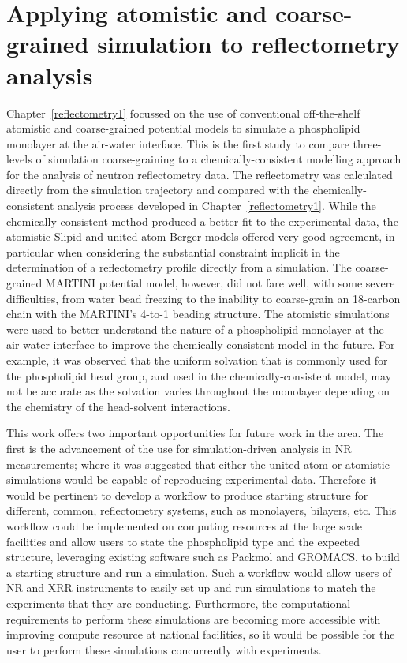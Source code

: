 \section{Applying atomistic and coarse-grained simulation to reflectometry analysis}
Chapter~\ref{reflectometry1} focussed on the use of conventional off-the-shelf atomistic and coarse-grained potential models to simulate a phospholipid monolayer at the air-water interface.
This is the first study to compare three-levels of simulation coarse-graining to a chemically-consistent modelling approach for the analysis of neutron reflectometry data.
The reflectometry was calculated directly from the simulation trajectory and compared with the chemically-consistent analysis process developed in Chapter~\ref{reflectometry1}.
While the chemically-consistent method produced a better fit to the experimental data, the atomistic Slipid and united-atom Berger models offered very good agreement, in particular when considering the substantial constraint implicit in the determination of a reflectometry profile directly from a simulation.
The coarse-grained MARTINI potential model, however, did not fare well, with some severe difficulties, from water bead freezing to the inability to coarse-grain an 18-carbon chain with the MARTINI's 4-to-1 beading structure.
The atomistic simulations were used to better understand the nature of a phospholipid monolayer at the air-water interface to improve the chemically-consistent model in the future.
For example, it was observed that the uniform solvation that is commonly used for the phospholipid head group, and used in the chemically-consistent model, may not be accurate as the solvation varies throughout the monolayer depending on the chemistry of the head-solvent interactions.

This work offers two important opportunities for future work in the area.
The first is the advancement of the use for simulation-driven analysis in NR measurements; where it was suggested that either the united-atom or atomistic simulations would be capable of reproducing experimental data.
Therefore it would be pertinent to develop a workflow to produce starting structure for different, common, reflectometry systems, such as monolayers, bilayers, etc.
This workflow could be implemented on computing resources at the large scale facilities and allow users to state the phospholipid type and the expected structure, leveraging existing software such as Packmol and GROMACS. to build a starting structure and run a simulation.
Such a workflow would allow users of NR and XRR instruments to easily set up and run simulations to match the experiments that they are conducting.
Furthermore, the computational requirements to perform these simulations are becoming more accessible with improving compute resource at national facilities, so it would be possible for the user to perform these simulations concurrently with experiments.

